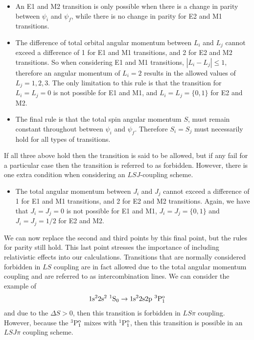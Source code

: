 \begin{itemize}
\item{An E1 and M2 transition is only possible when there is a change in parity between $\psi_i$ and $\psi_f$, while there is no change in parity for E2 and M1 transitions.}
\item{The difference of total orbital angular momentum between $L_i$ and $L_j$ cannot exceed a difference of 1 for E1 and M1 transitions, and 2 for E2 and M2 transitions. So when considering E1 and M1 transitions, $|L_i - L_j|\leq 1$, therefore an angular momentum of $L_i=2$ results in the allowed values of $L_j=1,2,3$. The only limitation to this rule is that the transition for $L_i=L_j=0$ is not possible for E1 and M1, and $L_i=L_j=\{0,1\}$ for E2 and M2.}
\item{The final rule is that the total spin angular momentum $S$, must remain constant throughout between $\psi_i$ and $\psi_f$. Therefore $S_i=S_j$ must necessarily hold for all types of transitions.}
\end{itemize}
If all three above hold then the transition is said to be allowed, but if any fail for a particular case then the transition is referred to as forbidden. However, there is one extra condition when considering an $LSJ$-coupling scheme.
\begin{itemize}
\item{The total angular momentum between $J_i$ and $J_j$ cannot exceed a difference of 1 for E1 and M1 transitions, and 2 for E2 and M2 transitions. Again, we have that $J_i=J_j=0$  is not possible for E1 and M1, $J_i=J_j=\{0,1\}$ and $J_i=J_j=1/2$ for E2 and M2.}
\end{itemize}
We can now replace the second and third points by this final point, but the rules for parity still hold. This last point stresses the importance of including relativistic effects into our calculations. Transitions that are normally considered forbidden in $LS$ coupling are in fact allowed due to the total angular momentum coupling and are referred to as intercombination lines. We can consider the example of
\[
1{\rm s}^22{\rm s}^2 ~^1{\rm S}_{0} \rightarrow 1{\rm s}^22{\rm s}2{\rm p} ~^3{\rm P}_1^{\rm o}
\]
and due to the $\Delta S>0$, then this transition is forbidden in $LS\pi$ coupling. However, because the $^3$P$^{\rm o}_{1}$ mixes with $^1$P$^{\rm o}_{1}$, then this transition is possible in an $LSJ\pi$ coupling scheme.



